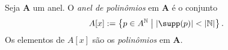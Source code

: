 \begin{comment}
	Agora, devemos mostrar que $(A[x],\odot)$ é um monoide comutativo. Novamente, as propriedades decorrem do fato de que $(A,\cdot)$ é um monoide comutativo com elemento neutro $1$. A operação $\odot$ é associativa, pois
	\begin{equation*}
	\begin{split}
	(f \odot g) \odot h &= \left( \sum_{i=0}^{m+n} \left(\sum_{j=0}^i a_jb_{i-j}\right)x^i \right) \odot h \\
		&= \sum_{i=0}^{m+n+l} \left( \sum_{j=0}^{i}\left(\sum_{k=0}^j a_kb_{j-k}\right)c_{i-j}\right)x^i \\
		&= \sum_{i=0}^{m+n+l} \left( \sum_{j=0}^{i}\left(\sum_{k=0}^j a_kb_{j-k}\right)c_{i-j}\right)x^i \\
		&= \\
		&= \sum_{i=0}^{m+n+l} \left( \right) \\
		&= f \odot \left( \sum_{i=0}^{n+l} \left(\sum_{j=0}^i b_jc_{i-j}\right)x^i \right) \\
		&= f \odot (g \odot h).
	 \end{split}
	 \end{equation*}
e comutativa, pois
	\begin{equation*}
	f \odot g = \sum_{i=0}^{m+n} \left(\sum_{j=0}^i a_jb_{i-j}\right)x^i = \sum_{i=0}^{n+m} \left(\sum_{j=0}^i b_ja_{i-j}\right)x^i = g \odot f.
	 \end{equation*}
Ainda, o polinômio $1_{A[x]} := 1$ é elemento neutro, pois
	\begin{equation*}
	f \odot 1_{A[x]} = \sum_{i=0}^{m+0} \left(\left(\sum_{j=0}^{i-1} a_j \cdot 0 \right) + a_i \cdot 1\right)x^i = \sum_{i=0}^m a_ix^i = f.
	 \end{equation*}

	 Por fim, distributividade...
\end{proof}

\begin{defi}
	Definimos o \emph{grau} de um polinômio $f \in A[x] \subseteq \{0\}$ como o maior índice de um coeficiente não nulo de $f$; ou seja, se $f=\sum_{i=0}^m a_ix^i$ com $a_m \neq 0$, então $\g(f)=m$.
\end{defi}

\end{comment}

\begin{defi}
Seja $\bm A$ um anel. O \emph{anel de polinômios} em $\bm A$ é o conjunto
	\begin{equation*}
	A[x] := \set{p \in A^\N}{\card{\supp(p)} < \card{\N}}.
	\end{equation*}
Os elementos de $A[x]$ são os \emph{polinômios} em $\bm A$.
\end{defi}

